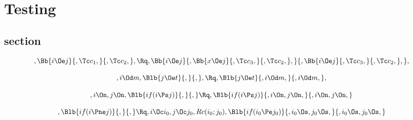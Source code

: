 \chapter{Testing}

\section{section}
\[, \Bb{i \Oe j}{,\Tc c_1,}{,\Tc c_2,}, \Rq , \Bb{i \Oe j}{, \Bb{x \Oe j}{,\Tc c_3,}{,\Tc c_2,},}{,\Bb{i \Oe j}{,\Tc c_3,}{,\Tc c_2,},} ,\]

\[,i \Od m, \Blb{j \Oe t}{,}{,}, \Rq , \Blb{j \Oe t}{,i \Od m,}{,i \Od m,},\]

\[,i \On, j \On, \Blb{if(i \Ps j)}{,}{,} \Rq , \Blb{if(i \Ps j)}{,i \On, j \On,}{,i \On, j \On,}\]

\[,\Blb{if(i \Pne j)}{,}{,} \Rq , i \Oc i_0, j \Oc j_0, Rc(i_0; j_0), \Blb{if(i_0 \Pe j_0)}{,i_0 \Os, j_0 \Os, }{, i_0 \Os, j_0 \Os, }\]
